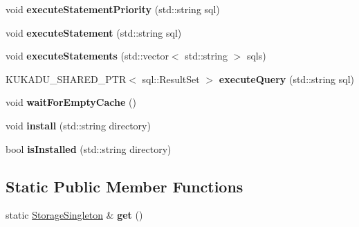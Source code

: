 \begin{DoxyCompactItemize}
\item 
void {\bfseries execute\+Statement\+Priority} (std\+::string sql)\hypertarget{classkukadu_1_1StorageSingleton_a840b0dc1ead0171c9af2a47b20327574}{}\label{classkukadu_1_1StorageSingleton_a840b0dc1ead0171c9af2a47b20327574}

\item 
void {\bfseries execute\+Statement} (std\+::string sql)\hypertarget{classkukadu_1_1StorageSingleton_aed66b98743013f5c4bd975c34091ba3a}{}\label{classkukadu_1_1StorageSingleton_aed66b98743013f5c4bd975c34091ba3a}

\item 
void {\bfseries execute\+Statements} (std\+::vector$<$ std\+::string $>$ sqls)\hypertarget{classkukadu_1_1StorageSingleton_a7d2119095f40b13faf2170ad89c0ca80}{}\label{classkukadu_1_1StorageSingleton_a7d2119095f40b13faf2170ad89c0ca80}

\item 
K\+U\+K\+A\+D\+U\+\_\+\+S\+H\+A\+R\+E\+D\+\_\+\+P\+TR$<$ sql\+::\+Result\+Set $>$ {\bfseries execute\+Query} (std\+::string sql)\hypertarget{classkukadu_1_1StorageSingleton_ad15276eb4de19d4229c5a1d6a0696ea8}{}\label{classkukadu_1_1StorageSingleton_ad15276eb4de19d4229c5a1d6a0696ea8}

\item 
void {\bfseries wait\+For\+Empty\+Cache} ()\hypertarget{classkukadu_1_1StorageSingleton_addd1cbee36e28f5a9be5814722472dd1}{}\label{classkukadu_1_1StorageSingleton_addd1cbee36e28f5a9be5814722472dd1}

\item 
void {\bfseries install} (std\+::string directory)\hypertarget{classkukadu_1_1StorageSingleton_a0b2506d50b58ec0af137d2d4ddb62e9c}{}\label{classkukadu_1_1StorageSingleton_a0b2506d50b58ec0af137d2d4ddb62e9c}

\item 
bool {\bfseries is\+Installed} (std\+::string directory)\hypertarget{classkukadu_1_1StorageSingleton_a31bf253bcfb731cf0acff86c8e38537b}{}\label{classkukadu_1_1StorageSingleton_a31bf253bcfb731cf0acff86c8e38537b}

\end{DoxyCompactItemize}
\subsection*{Static Public Member Functions}
\begin{DoxyCompactItemize}
\item 
static \hyperlink{classkukadu_1_1StorageSingleton}{Storage\+Singleton} \& {\bfseries get} ()\hypertarget{classkukadu_1_1StorageSingleton_a435bc0e9780ca98ddf89e84cea52b902}{}\label{classkukadu_1_1StorageSingleton_a435bc0e9780ca98ddf89e84cea52b902}

\end{DoxyCompactItemize}


